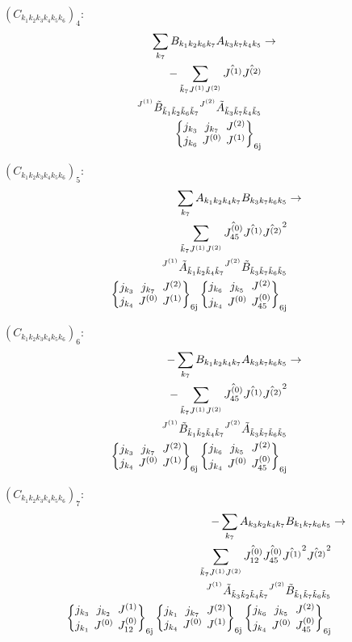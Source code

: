 \documentclass[11pt]{article}
\newcommand{\sixj}[6]{\begingroup\setlength{\arraycolsep}{0.2em}\begin{Bmatrix} #1 & #2 & #3 \\ #4 & #5 & #6 \end{Bmatrix}_{\text{6j}}\endgroup}
\begin{document}
$\left({C}_{{k}_{1}{k}_{2}{k}_{3}{k}_{4}{k}_{5}{k}_{6}}\right)_{4}$:
\begin{align}
\sum_{{k}_{7}}{B}_{{k}_{1}{k}_{2}{k}_{6}{k}_{7}}{A}_{{k}_{3}{k}_{7}{k}_{4}{k}_{5}}&\rightarrow \notag \\-\sum_{\tilde{k}_{7}J^{(1)}J^{(2)}}\hat{J^{(1)}}\hat{J^{(2)}}& \notag \\{}^{J^{(1)}}\tilde{B}_{\tilde{k}_{1}\tilde{k}_{2}\tilde{k}_{6}\tilde{k}_{7}}{}^{J^{(2)}}\tilde{A}_{\tilde{k}_{3}\tilde{k}_{7}\tilde{k}_{4}\tilde{k}_{5}}& \notag \\\sixj{j_{{k}_{3}}}{j_{{k}_{7}}}{J^{(2)}}{j_{{k}_{6}}}{J^{(0)}}{J^{(1)}}
\end{align}

$\left({C}_{{k}_{1}{k}_{2}{k}_{3}{k}_{4}{k}_{5}{k}_{6}}\right)_{5}$:
\begin{align}
\sum_{{k}_{7}}{A}_{{k}_{1}{k}_{2}{k}_{4}{k}_{7}}{B}_{{k}_{3}{k}_{7}{k}_{6}{k}_{5}}&\rightarrow \notag \\\sum_{\tilde{k}_{7}J^{(1)}J^{(2)}}\hat{J^{(0)}_{45}}\hat{J^{(1)}}\hat{J^{(2)}}^{2}& \notag \\{}^{J^{(1)}}\tilde{A}_{\tilde{k}_{1}\tilde{k}_{2}\tilde{k}_{4}\tilde{k}_{7}}{}^{J^{(2)}}\tilde{B}_{\tilde{k}_{3}\tilde{k}_{7}\tilde{k}_{6}\tilde{k}_{5}}& \notag \\\sixj{j_{{k}_{3}}}{j_{{k}_{7}}}{J^{(2)}}{j_{{k}_{4}}}{J^{(0)}}{J^{(1)}}\sixj{j_{{k}_{6}}}{j_{{k}_{5}}}{J^{(2)}}{j_{{k}_{4}}}{J^{(0)}}{J^{(0)}_{45}}
\end{align}

$\left({C}_{{k}_{1}{k}_{2}{k}_{3}{k}_{4}{k}_{5}{k}_{6}}\right)_{6}$:
\begin{align}
-\sum_{{k}_{7}}{B}_{{k}_{1}{k}_{2}{k}_{4}{k}_{7}}{A}_{{k}_{3}{k}_{7}{k}_{6}{k}_{5}}&\rightarrow \notag \\-\sum_{\tilde{k}_{7}J^{(1)}J^{(2)}}\hat{J^{(0)}_{45}}\hat{J^{(1)}}\hat{J^{(2)}}^{2}& \notag \\{}^{J^{(1)}}\tilde{B}_{\tilde{k}_{1}\tilde{k}_{2}\tilde{k}_{4}\tilde{k}_{7}}{}^{J^{(2)}}\tilde{A}_{\tilde{k}_{3}\tilde{k}_{7}\tilde{k}_{6}\tilde{k}_{5}}& \notag \\\sixj{j_{{k}_{3}}}{j_{{k}_{7}}}{J^{(2)}}{j_{{k}_{4}}}{J^{(0)}}{J^{(1)}}\sixj{j_{{k}_{6}}}{j_{{k}_{5}}}{J^{(2)}}{j_{{k}_{4}}}{J^{(0)}}{J^{(0)}_{45}}
\end{align}

$\left({C}_{{k}_{1}{k}_{2}{k}_{3}{k}_{4}{k}_{5}{k}_{6}}\right)_{7}$:
\begin{align}
-\sum_{{k}_{7}}{A}_{{k}_{3}{k}_{2}{k}_{4}{k}_{7}}{B}_{{k}_{1}{k}_{7}{k}_{6}{k}_{5}}&\rightarrow \notag \\\sum_{\tilde{k}_{7}J^{(1)}J^{(2)}}\hat{J^{(0)}_{12}}\hat{J^{(0)}_{45}}\hat{J^{(1)}}^{2}\hat{J^{(2)}}^{2}& \notag \\{}^{J^{(1)}}\tilde{A}_{\tilde{k}_{3}\tilde{k}_{2}\tilde{k}_{4}\tilde{k}_{7}}{}^{J^{(2)}}\tilde{B}_{\tilde{k}_{1}\tilde{k}_{7}\tilde{k}_{6}\tilde{k}_{5}}& \notag \\\sixj{j_{{k}_{3}}}{j_{{k}_{2}}}{J^{(1)}}{j_{{k}_{1}}}{J^{(0)}}{J^{(0)}_{12}}\sixj{j_{{k}_{1}}}{j_{{k}_{7}}}{J^{(2)}}{j_{{k}_{4}}}{J^{(0)}}{J^{(1)}}\sixj{j_{{k}_{6}}}{j_{{k}_{5}}}{J^{(2)}}{j_{{k}_{4}}}{J^{(0)}}{J^{(0)}_{45}}
\end{align}
\end{document}
